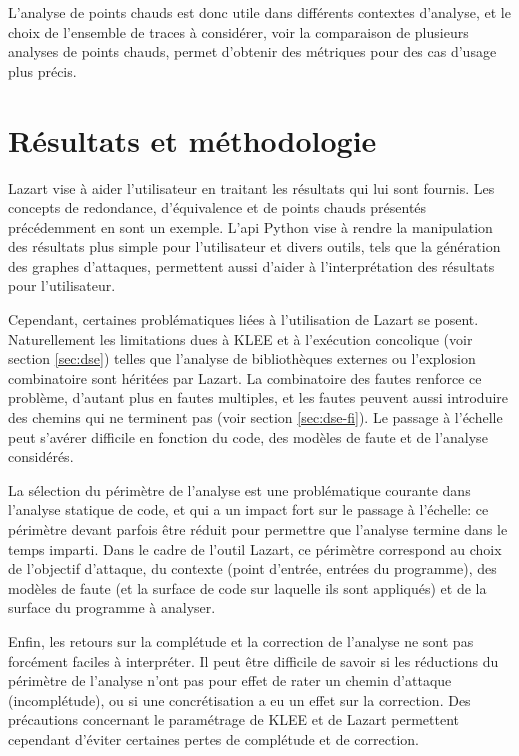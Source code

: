                 L'analyse de points chauds est donc utile dans différents contextes d'analyse, et le choix de l'ensemble de traces à considérer, voir la comparaison de plusieurs analyses de points chauds, permet d'obtenir des métriques pour des cas d'usage plus précis.
            
    \section{Résultats et méthodologie}
    \label{lazart:metho}
     
        Lazart vise à aider l'utilisateur en traitant les résultats qui lui sont fournis. Les concepts de redondance, d'équivalence et de points chauds présentés précédemment en sont un exemple.
        L'\gls{api} Python vise à rendre la manipulation des résultats plus simple pour l'utilisateur et divers outils, tels que la génération des graphes d'attaques, permettent aussi d'aider à l'interprétation des résultats pour l'utilisateur.
        
        Cependant, certaines problématiques liées à l'utilisation de Lazart se posent.
        Naturellement les limitations dues à KLEE et à l'exécution concolique (voir section \ref{sec:dse}) telles que l'analyse de bibliothèques externes ou l'explosion combinatoire sont héritées par Lazart. 
        La combinatoire des fautes renforce ce problème, d'autant plus en fautes multiples, et les fautes peuvent aussi introduire des chemins qui ne terminent pas (voir section \ref{sec:dse-fi}).
        Le passage à l'échelle peut s'avérer difficile en fonction du code, des modèles de faute et de l'analyse considérés.
        
        La sélection du périmètre de l'analyse est une problématique courante dans l'analyse statique de code, et qui a un impact fort sur le passage à l'échelle: ce périmètre devant parfois être réduit pour permettre que l'analyse termine dans le temps imparti.
        Dans le cadre de l'outil Lazart, ce périmètre correspond au choix de l'objectif d'attaque, du contexte (point d'entrée, entrées du programme), des modèles de faute (et la surface de code sur laquelle ils sont appliqués) et de la surface du programme à analyser.
        
        Enfin, les retours sur la complétude et la correction de l'analyse ne sont pas forcément faciles à interpréter. Il peut être difficile de savoir si les réductions du périmètre de l'analyse n'ont pas pour effet de rater un chemin d'attaque (incomplétude), ou si une concrétisation a eu un effet sur la correction.
        Des précautions concernant le paramétrage de KLEE et de Lazart permettent cependant d'éviter certaines pertes de complétude et de correction.
        
